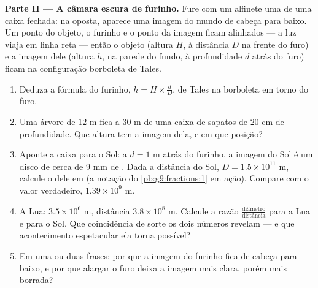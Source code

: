 \begin{problem}
\medskip
\noindent\textbf{Parte II --- A câmara escura de furinho.}
Fure com um alfinete uma  de uma caixa fechada: na  oposta,
aparece uma imagem do mundo de cabeça para baixo. Um ponto do objeto, o
furinho e o ponto da imagem ficam alinhados --- a luz viaja em linha
reta --- então o objeto (altura $H$, à distância $D$ na frente do
furo) e a imagem dele (altura $h$, na parede do fundo, à profundidade
$d$ atrás do furo) ficam na configuração borboleta de Tales.
\begin{enumerate}[resume]
  \item Deduza a fórmula do furinho, $h = H \times \frac dD$, de Tales
        na borboleta em torno do furo.
  \item Uma árvore de $12$ m fica a $30$ m de uma caixa de sapatos de
        $20$ cm de profundidade. Que altura tem a imagem dela, e em que
        posição?
  \item Aponte a caixa para o Sol: a $d = 1$ m atrás do furinho, a
        imagem do Sol é um disco de cerca de $9$ mm de . Dada a
        distância do Sol, $D = 1.5 \times 10^{11}$ m, calcule o
         dele em  (a notação do
        \cref{pb:g9:fractions:1} em ação). Compare com o valor
        verdadeiro, $1.39 \times 10^9$ m.
  \item A Lua:  $3.5 \times 10^6$ m, distância
        $3.8 \times 10^8$ m. Calcule a razão
        $\frac{\text{diâmetro}}{\text{distância}}$ para a Lua e para o
        Sol. Que coincidência de sorte os dois números revelam --- e
        que acontecimento espetacular ela torna possível?
  \item Em uma ou duas frases: por que a imagem do furinho fica de
        cabeça para baixo, e por que alargar o furo deixa a imagem mais
        clara, porém mais borrada?
\end{enumerate}


\end{problem}
